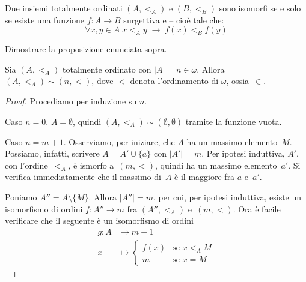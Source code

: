 \begin{remark}
	Due insiemi {\drkred totalmente} ordinati $(A,<_A)$ e $(B,<_B)$
sono isomorfi se e solo se esiste una funzione $f\colon A \to B$
surgettiva e  -- cio\`e tale che:
	\[ \forall {x,y \in A} \; x <_A y \; \rightarrow \; f(x) <_B f(y)
		\]
\end{remark}

\begin{exercise}
	Dimostrare la proposizione enunciata sopra.
\end{exercise}

\begin{remark}\label{ord-fin}
	Sia $(A,<_A)$ totalmente ordinato con $|A| = n \in \omega$. Allora
$(A,<_A) \sim (n,<)$, dove $<$ denota l'ordinamento di $\omega$,
ossia~$\in$.
\end{remark}

\begin{proof}
	Procediamo per induzione su $n$.

{\drkred Caso $n = 0$.} $A = \emptyset$, quindi $(A,<_A) \sim (\emptyset,\emptyset)$ tramite la funzione vuota.

{\drkred Caso $n = m + 1$.} Osserviamo, per iniziare, che $A$ ha un
massimo elemento~$M$. Possiamo, infatti, scrivere $A=A'\cup\{a\}$ con
$|A'|=m$. Per ipotesi induttiva, $A'$, con l'ordine~$<_A$, \`e ismorfo
a~$(m,<)$, quindi ha un massimo elemento~$a'$. Si verifica immediatamente
che il massimo di~$A$ \`e il maggiore fra $a$ e~$a'$.

Poniamo $A'' = A\setminus\{M\}$. Allora $|A''| = m$, per cui, per ipotesi
induttiva, esiste un
isomorfismo di ordini $f\colon A''\to m$ fra $(A'',<_A)$ e~$(m,<)$. Ora
\`e facile verificare che il seguente \`e un isomorfismo di ordini
\begin{align*}
g\colon A &\to m+1 \\
x &\mapsto \begin{cases}
f(x) &\text{se $x <_A M$} \\
m &\text{se $x = M$}
\end{cases}
\end{align*}
\baselineskip
\end{proof}


